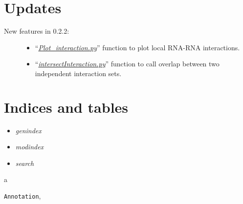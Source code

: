 \documentclass[letterpaper,10pt,english]{sphinxmanual}
\begin{document}
\chapter{Updates}
\label{index:updates}\begin{description}
\item[{New features in 0.2.2:}] \leavevmode\begin{itemize}
\item {} 
``{\hyperref[Visualization:plotinteraction]{\emph{Plot\_interaction.py}}}'' function to plot local RNA-RNA interactions.

\item {} 
``{\hyperref[Analysis_pipeline:intersection]{\emph{intersectInteraction.py}}}'' function to call overlap between two independent interaction sets.

\end{itemize}

\end{description}


\chapter{Indices and tables}
\label{index:indices-and-tables}\begin{itemize}
\item {} 
\emph{genindex}

\item {} 
\emph{modindex}

\item {} 
\emph{search}

\end{itemize}


\renewcommand{\indexname}{Python Module Index}
\begin{theindex}
\def\bigletter#1{{\Large\sffamily#1}\nopagebreak\vspace{1mm}}
\bigletter{a}
\item {\texttt{Annotation}}, \pageref{Other_api:module-Annotation}
\end{theindex}

\renewcommand{\indexname}{Index}
\printindex
\end{document}
